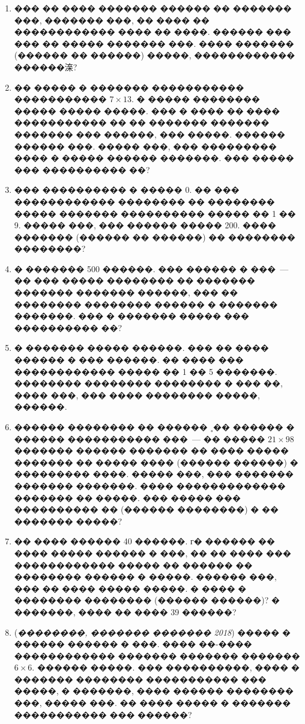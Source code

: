 \documentclass[a4paper,12pt]{article}
\begin{document}
\medskip\medskip\medskip

\begin{enumerate}
\item ��� �� ���� ������� ������ �� ������� ���, ������� ���, �� ���� �� ������������ ���� �� ����. ������ ��� ��� �� ����� ������� ���. ���� ������� (������ �� ������) �����, ������������ ������㳿?

\item �� ����� � ������� ����������� ����������� $7\times 13$. � ����� �������� ����� ����� �����. ��� � ���� �� ���� ����������� �� �� ������� ������� ������� ��� ������, ��� �����. ������ ������ ���. ����� ���, ��� ��������� ���� � ����� ������ �������. ��� ����� ��� ���������� ��?

\item ��� ���������� � ����� 0. �� ��� ������������ �������� �� �������� ����� ������� ���������� ����� �� 1 �� 9. ����� ���, ��� ������ ����� 200. ���� ������� (������ �� ������) �� �������� ��������?

\item � ������� 500 ������. ��� ������ � ���~--- �� ��� ����� �������� �� ������� ������� ������� ������, ��� �� �������� �������� ������ � ������� �������. ��� � ������� ����� ��� ���������� ��?

\item � ������� ����� ������. ��� �� ���� ������ � ��� ������. �� ���� ��� ������������ ����� �� 1 �� 5 �������. �������� �������� �������� � ��� ��, ���� ���, ��� ���� �������� �����, ������.

\item  ������ �������� �� ������ ˳�� ������ � ������ ����������� ���~--- �� ����� $21\times 98$ ������� ������ ������� �� ���� ����� ������� �� ����� ���� (������ ������) � ��������� ����. ����� ���, ��� ������� ������� �������. ���� ������������� ������� �� �����. ��� ����� ��� ���������� �� (������ ��������) � �� ������� �����?

\item �� ���� ������ 40 ������. г� ������ �� ���� ����� ������ � ���, �� �� ���� ��� ������������ ����� �� ������ �� �������� ������ � �����. ������ ���, ��� �� ���� ����� �����. � ���� � �������� �������� (������ ������)? � �������, ���� �� ���� 39 ������?

\item (\textit{��������, ������� ������� 2018}) ����� � ������ ������ � ���. ���� ��-���� ������������ ������� ������� ������� $6\times 6$. ������ �����. ��� ����������, ���� � ������� �������� ����������� ��� �����, � �������, ���� ������ �������� ���, ����� ���. �� ���� ����� � ������� ����������� ��� ������?


\end{enumerate}
\end{document}
